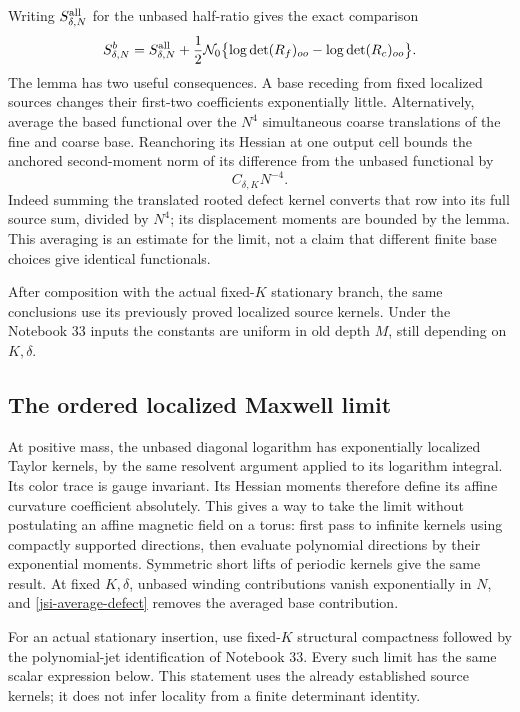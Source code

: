 Writing \(S_{\delta,N}^{\rm all}\) for the unbased half-ratio gives
the exact comparison
\begin{equation}
 S_{\delta,N}^b=S_{\delta,N}^{\rm all}
 +\frac12\mathcal N_0\bigl\{
       \log\det(R_f)_{oo}-\log\det(R_c)_{oo}\bigr\}.
 \label{jsi-defect}
\end{equation}
The lemma has two useful consequences. A base receding from fixed
localized sources changes their first-two coefficients
exponentially little. Alternatively, average the based functional
over the \(N^4\) simultaneous coarse translations of the fine and
coarse base. Reanchoring its Hessian at one output cell bounds the
anchored second-moment norm of its difference from the unbased
functional by
\begin{equation}
                         C_{\delta,K}N^{-4}.
 \label{jsi-average-defect}
\end{equation}
Indeed summing the translated rooted defect kernel converts that
row into its full source sum, divided by \(N^4\); its displacement
moments are bounded by the lemma. This averaging is an estimate
for the limit, not a claim that different finite base choices
give identical functionals.

After composition with the actual fixed-\(K\) stationary branch,
the same conclusions use its previously proved localized source
kernels. Under the Notebook 33 inputs the constants are uniform
in old depth \(M\), still depending on \(K,\delta\).

\subsection{The ordered localized Maxwell limit}
\label{jsi-ordered-section}

At positive mass, the unbased diagonal logarithm has exponentially
localized Taylor kernels, by the same resolvent argument applied
to its logarithm integral. Its color trace is gauge invariant.
Its Hessian moments therefore define its affine curvature
coefficient absolutely. This gives a way to take the limit without
postulating an affine magnetic field on a torus: first pass to
infinite kernels using compactly supported directions, then
evaluate polynomial directions by their exponential moments.
Symmetric short lifts of periodic kernels give the same result.
At fixed \(K,\delta\), unbased winding contributions vanish
exponentially in \(N\), and \eqref{jsi-average-defect} removes the
averaged base contribution.

For an actual stationary insertion, use fixed-\(K\) structural
compactness followed by the polynomial-jet identification of
Notebook 33. Every such limit has the same scalar expression
below. This statement uses the already established source kernels;
it does not infer locality from a finite determinant identity.

